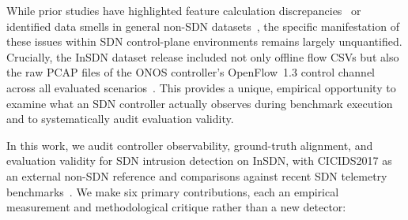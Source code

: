 \documentclass[journal]{IEEEtran}
\begin{document}
While prior studies have highlighted feature calculation discrepancies~\cite{sarhan2022standard,pinto2025flowexporter,pekar2024partial,pekar2024integrity} or identified data smells in general non-SDN datasets~\cite{flood2024baddesign,berhili2026evaluation}, the specific manifestation of these issues within SDN control-plane environments remains largely unquantified. Crucially, the InSDN dataset release included not only offline flow CSVs but also the raw PCAP files of the ONOS controller's OpenFlow~1.3 control channel across all evaluated scenarios~\cite{elsayed2020insdn}. This provides a unique, empirical opportunity to examine what an SDN controller actually observes during benchmark execution and to systematically audit evaluation validity.

In this work, we audit controller observability, ground-truth alignment, and evaluation validity for SDN intrusion detection on InSDN, with CICIDS2017 as an external non-SDN reference and comparisons against recent SDN telemetry benchmarks~\cite{lansdnnids2026,aseados_sdn_iot2026,sdnflow2024,ashraf2026survey}. We make six primary contributions, each an empirical measurement and methodological critique rather than a new detector:
\end{document}
